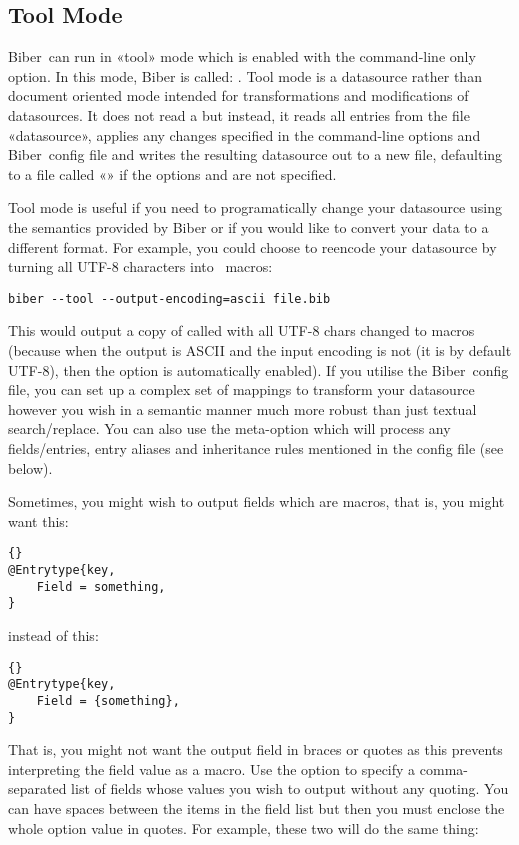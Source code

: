 \documentclass{ltxdockit}
\newcommand*{\biber}{Biber\xspace}
\begin{document}
\subsection{Tool Mode}\label{ref:tool}
\biber\ can run in «tool» mode which is enabled with the 
command-line only option. In this mode, \biber is called: . Tool mode is a datasource rather than document oriented
mode intended for transformations and modifications of datasources. It does
not read a  but instead, it reads all entries from the file
«datasource», applies any changes specified in the command-line options and
\biber\ config file and writes the resulting datasource out to a new file,
defaulting to a \bibtex file called «» if
the options  and  are not specified.

Tool mode is useful if you need to programatically change your datasource
using the semantics provided by \biber or if you would like to convert your
data to a different format. For example, you could choose to reencode your
datasource by turning all UTF-8 characters into \latex\ macros:

\begin{verbatim}
biber --tool --output-encoding=ascii file.bib
\end{verbatim}

\noindent This would output a copy of  called  with all
UTF-8 chars changed to \latex macros (because when the output is ASCII and
the input encoding is not (it is by default UTF-8), then the
 option is automatically enabled). If you utilise the \biber\
config file, you can set up a complex set of mappings to transform
your datasource however you wish in a semantic manner much more robust
than just textual search/replace. You can also use the
 meta-option which will process any 
fields/entries, entry aliases and inheritance rules mentioned in the config
file (see below).

Sometimes, you might wish to output fields which are \bibtex macros,
that is, you might want this:

\begin{lstlisting}[style=bibtex, columns=fixed]{}
@Entrytype{key,
    Field = something,
}
\end{lstlisting}
%
instead of this:
\begin{lstlisting}[style=bibtex, columns=fixed]{}
@Entrytype{key,
    Field = {something},
}
\end{lstlisting}
%
That is, you might not want the output field in braces or quotes as
this prevents \bibtex interpreting the field value as a macro. Use the
\opt{--output-macro-fields} option to specify a comma-separated list
of fields whose values you wish to output without any \bibtex
quoting. You can have spaces between the items in the field list but
then you must enclose the whole option value in quotes. For example,
these two will do the same thing:
\end{document}

